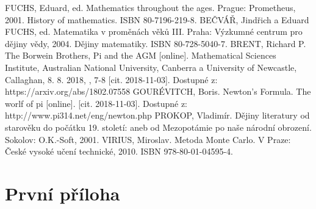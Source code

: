 \documentclass[rocnikovka]{gzwroc} %
\begin{document}
\begin{oldthebibliography}{99}
FUCHS, Eduard, ed. Mathematics throughout the ages. Prague: Prometheus, 2001. History of mathematics. ISBN 80-7196-219-8.
BEČVÁŘ, Jindřich a Eduard FUCHS, ed. Matematika v proměnách věků III. Praha: Výzkumné centrum pro dějiny vědy, 2004. Dějiny matematiky. ISBN 80-728-5040-7.
BRENT, Richard P. The Borwein Brothers, Pi and the AGM [online]. Mathematical Sciences Institute, Australian National University, Canberra a University of Newcastle, Callaghan, 8. 8. 2018, , 7-8 [cit. 2018-11-03]. Dostupné z: https://arxiv.org/abs/1802.07558
GOURÉVITCH, Boris. Newton's Formula. The worlf of pi [online]. [cit. 2018-11-03]. Dostupné z: http://www.pi314.net/eng/newton.php
PROKOP, Vladimír. Dějiny literatury od starověku do počátku 19. století: aneb od Mezopotámie po naše národní obrození. Sokolov: O.K.-Soft, 2001.
VIRIUS, Miroslav. Metoda Monte Carlo. V Praze: České vysoké učení technické, 2010. ISBN 978-80-01-04595-4.
\end{oldthebibliography}
\newpage
\listoffigures
\listoftables
\newpage
\prilohy
\section{První příloha} %
\end{document}
